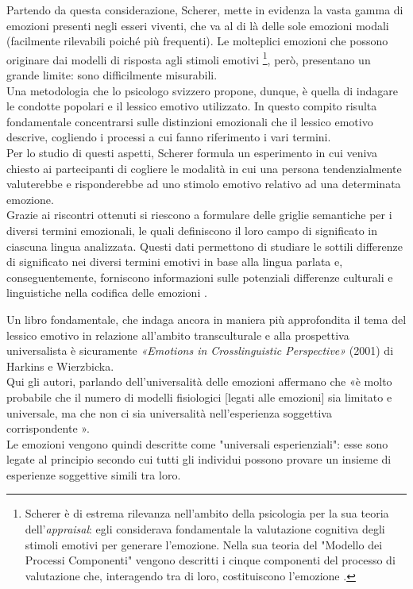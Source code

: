 Partendo da questa considerazione, Scherer, mette in evidenza la vasta gamma di emozioni presenti negli esseri viventi, che va al di là delle sole emozioni modali (facilmente rilevabili poiché più frequenti). Le molteplici emozioni che possono originare dai modelli di risposta agli stimoli emotivi \footnote {Scherer è di estrema rilevanza nell'ambito della psicologia per la sua teoria dell'\textit{appraisal}: egli considerava fondamentale la valutazione cognitiva degli stimoli emotivi per generare l'emozione. Nella sua teoria del "Modello dei Processi Componenti" vengono descritti i cinque componenti del processo di valutazione che, interagendo tra di loro, costituiscono l'emozione \parencite{teoria_componenti_scherer}.}, però, presentano un grande limite: sono difficilmente misurabili.\\
Una metodologia che lo psicologo svizzero propone, dunque, è quella di indagare le condotte popolari e il lessico emotivo utilizzato. In questo compito risulta fondamentale concentrarsi sulle distinzioni emozionali che il lessico emotivo descrive, cogliendo i processi a cui fanno riferimento i vari termini.\\
Per lo studio di questi aspetti, Scherer formula un esperimento in cui veniva chiesto ai partecipanti di cogliere le modalità in cui una persona tendenzialmente valuterebbe e risponderebbe ad uno stimolo emotivo relativo ad una determinata emozione.\\
Grazie ai riscontri ottenuti si riescono a formulare delle griglie semantiche per i diversi termini emozionali, le quali definiscono il loro campo di significato in ciascuna lingua analizzata. Questi dati permettono di studiare le sottili differenze di significato nei diversi termini emotivi in base alla lingua parlata e, conseguentemente, forniscono informazioni sulle potenziali differenze culturali e linguistiche nella codifica delle emozioni \parencite{scherer}.

Un libro fondamentale, che indaga ancora in maniera più approfondita il tema del lessico emotivo in relazione all'ambito transculturale e alla prospettiva universalista è sicuramente \textit{«Emotions in Crosslinguistic Perspective»} (2001) di Harkins e Wierzbicka. \\
Qui gli autori, parlando dell'universalità delle emozioni affermano che «è molto probabile che il numero di modelli fisiologici [legati alle emozioni] sia limitato e universale, ma che non ci sia universalità nell'esperienza soggettiva corrispondente \parencite{Wierzbicka}».\\
Le emozioni vengono quindi descritte come "universali esperienziali": esse sono legate al principio secondo cui tutti gli individui possono provare un insieme di esperienze soggettive simili tra loro. 

